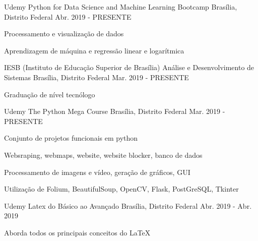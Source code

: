 

\begin{cventries}
	
	\cventry
		{Udemy} %
		{Python for Data Science and Machine Learning Bootcamp} %
		{Brasília, Distrito Federal} %
		{Abr. 2019 - PRESENTE} %
		{
			\begin{cvitems} %
				\item {Processamento e visualização de dados} 
				\item {Aprendizagem de máquina e regressão linear e logarítmica}
			\end{cvitems}
		}
	\cventry
		{IESB (Instituto de Educação Superior de Brasília)} %
		{Análise e Desenvolvimento de Sistemas} %
		{Brasília, Distrito Federal} %
		{Mar. 2019 - PRESENTE} %
		{
			\begin{cvitems}
				\item {Graduação de nível tecnólogo}
			\end{cvitems}	
		}
	\cventry
		{Udemy} %
		{The Python Mega Course} %
		{Brasília, Distrito Federal} %
		{Mar. 2019 - PRESENTE} %
		{
			\begin{cvitems} %
				\item {Conjunto de projetos funcionais em python} 
				\item {Websraping, webmaps, website, website blocker, banco de dados}
				\item {Processamento de imagens e vídeo, geração de gráficos, GUI}
				\item {Utilização de Folium, BeautifulSoup, OpenCV, Flask, PostGreSQL, Tkinter}
			\end{cvitems}
		}
	\cventry
		{Udemy} %
		{Latex do Básico ao Avançado} %
		{Brasília, Distrito Federal} %
		{Abr. 2019 - Abr. 2019} %
		{
			\begin{cvitems} %
				\item {Aborda todos os principais conceitos do LaTeX} 

\end{cvitems}}
\end{cventries}
